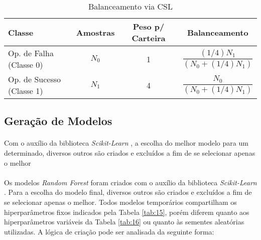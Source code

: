 \begin{table}[h!]
    \begin{center}
        \begin{tabular}{ l|c|c|c }
            Classe & Amostras & Peso p/ Carteira & Balanceamento \\
            \hline
            Op. de Falha (Classe 0) & \begin{math} N_0 \end{math} & 1 & \begin{math} \dfrac{(1/4)N_1}{(N_0+(1/4)N_1)} \end{math} \\
            Op. de Sucesso (Classe 1) & \begin{math} N_1 \end{math} & 4 & \begin{math} \dfrac{N_0}{(N_0+(1/4)N_1)} \end{math} \\
        \end{tabular}
        \caption{Balanceamento via CSL}
        \label{tab:8}
    \end{center}
\end{table}



\FloatBarrier
\subsection{Geração de Modelos}
\label{sub:models_gen}

\paragraph{} Com o auxílio da biblioteca \textit{Scikit-Learn} \cite{scikit}, a escolha do melhor modelo para um determinado, diversos outros são criados e excluídos a fim de se selecionar apenas o melhor

\paragraph{} Os modelos \textit{Random Forest} foram criados com o auxílio da biblioteca \textit{Scikit-Learn} \cite{scikit}. Para a escolha do modelo final, diversos outros são criados e excluídos a fim de se selecionar apenas o melhor. Todos modelos temporários compartilham os hiperparâmetros fixos indicados pela Tabela \ref{tab:15}, porém diferem quanto aos hiperparâmetros variáveis da Tabela \ref{tab:16} ou quanto às sementes aleatórias utilizadas. A lógica de criação pode ser analisada da seguinte forma:

